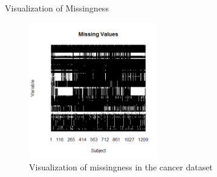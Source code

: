 \begin{frame}{Visualization of Missingness}
 \begin{figure}[h!]
  \centering
    \includegraphics[width=0.5\textwidth]{missingvalues_plot.png}
  \caption{Visualization of missingness in the cancer dataset}
\label{fig:missingplot}

\end{figure}
\end{frame}

